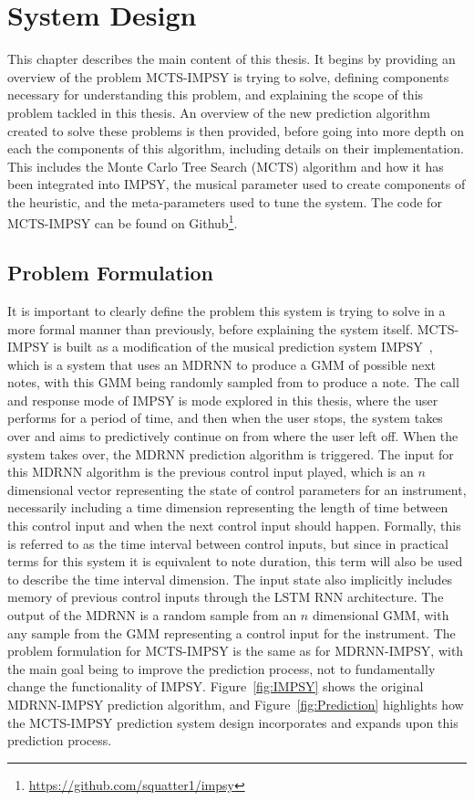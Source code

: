 \chapter{System Design}\label{chap:systemDesign}

This chapter describes the main content of this thesis. It begins by providing an overview of the problem MCTS-IMPSY is trying to solve, defining components necessary for understanding this problem, and explaining the scope of this problem tackled in this thesis. An overview of the new prediction algorithm created to solve these problems is then provided, before going into more depth on each the components of this algorithm, including details on their implementation. This includes the Monte Carlo Tree Search (MCTS) algorithm and how it has been integrated into IMPSY, the musical parameter used to create components of the heuristic, and the meta-parameters used to tune the system. The code for MCTS-IMPSY can be found on Github\footnote{\url{https://github.com/squatter1/impsy}}.

\section{Problem Formulation}
It is important to clearly define the problem this system is trying to solve in a more formal manner than previously, before explaining the system itself. MCTS-IMPSY is built as a modification of the musical prediction system IMPSY~\citep{Martin2019IMPSY}, which is a system that uses an MDRNN to produce a GMM of possible next notes, with this GMM being randomly sampled from to produce a note. The call and response mode of IMPSY is mode explored in this thesis, where the user performs for a period of time, and then when the user stops, the system takes over and aims to predictively continue on from where the user left off. When the system takes over, the MDRNN prediction algorithm is triggered. The input for this MDRNN algorithm is the previous control input played, which is an $n$ dimensional vector representing the state of control parameters for an instrument, necessarily including a time dimension representing the length of time between this control input and when the next control input should happen. Formally, this is referred to as the time interval between control inputs, but since in practical terms for this system it is equivalent to note duration, this term will also be used to describe the time interval dimension. The input state also implicitly includes memory of previous control inputs through the LSTM RNN architecture. The output of the MDRNN is a random sample from an $n$ dimensional GMM, with any sample from the GMM representing a control input for the instrument. The problem formulation for MCTS-IMPSY is the same as for MDRNN-IMPSY, with the main goal being to improve the prediction process, not to fundamentally change the functionality of IMPSY. Figure~\ref{fig:IMPSY} shows the original MDRNN-IMPSY prediction algorithm, and Figure~\ref{fig:Prediction} highlights how the MCTS-IMPSY prediction system design incorporates and expands upon this prediction process. 

